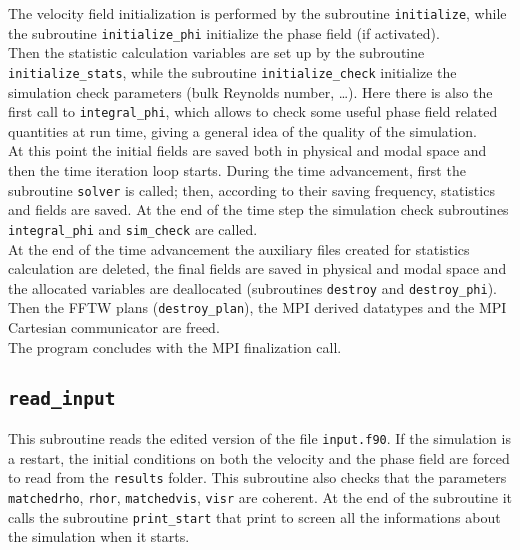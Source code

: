The velocity field initialization is performed by the subroutine \texttt{initialize}, while the subroutine \texttt{initialize\_phi} initialize the phase field (if activated).\\
Then the statistic calculation variables are set up by the subroutine \texttt{initialize\_stats}, while the subroutine \texttt{initialize\_check} initialize the simulation check parameters (bulk Reynolds number, \dots). Here there is also the first call to \texttt{integral\_phi}, which allows to check some useful phase field related quantities at run time, giving a general idea of the quality of the simulation.\\
At this point the initial fields are saved both in physical and modal space and then the time iteration loop starts. During the time advancement, first the subroutine \texttt{solver} is called; then, according to their saving frequency, statistics and fields are saved. At the end of the time step  the simulation check subroutines \texttt{integral\_phi} and \texttt{sim\_check} are called.\\
At the end of the time advancement the auxiliary files created for statistics calculation are deleted, the final fields are saved in physical and modal space and the allocated variables are deallocated (subroutines \texttt{destroy} and \texttt{destroy\_phi}). Then the FFTW plans (\texttt{destroy\_plan}), the MPI derived datatypes and the MPI Cartesian communicator are freed.\\
The program concludes with the MPI finalization call.

\subsection{\texttt{read\_input}}
This subroutine reads the edited version of the file \texttt{input.f90}. If the simulation is a restart, the initial conditions on both the velocity and the phase field are forced to read from the \texttt{results} folder. This subroutine also checks that the parameters \texttt{matchedrho}, \texttt{rhor}, \texttt{matchedvis}, \texttt{visr} are coherent. At the end of the subroutine it calls the subroutine \texttt{print\_start} that print to screen all the informations about the simulation when it starts.

